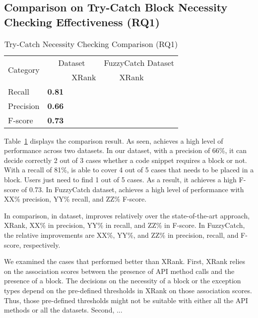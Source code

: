 \subsection{Comparison on Try-Catch Block Necessity Checking Effectiveness (RQ1)}
\label{sec:rq1}

\begin{table}[h]
  \caption{Try-Catch Necessity Checking Comparison (RQ1)}
  \vspace{-12pt}
	\begin{center}
		\renewcommand{\arraystretch}{1}
		\begin{tabular}{p{1.5cm}<{\centering}|p{1.25cm}<{\centering}p{1.25cm}<{\centering}|p{1.25cm}<{\centering}p{1.25cm}<{\centering}}
			\hline
			\multirow{2}{*}{Category} & \multicolumn{2}{c|}{{\tool} Dataset} & \multicolumn{2}{c}{FuzzyCatch Dataset}\\
			\cline{2-5}
			  & \tool  & XRank & \tool  & XRank\\
			\hline
			Recall    & \textbf{0.81} & &&\\
			Precision & \textbf{0.66} & &&\\
			F-score   & \textbf{0.73} & &&\\
			\hline
		\end{tabular}
		\label{tab:xblock}
	\end{center}
\end{table}


Table~\ref{tab:xblock} displays the comparison result. As seen,
{\tool} achieves a high level of performance across two datasets. In
our dataset, with a precision of 66\%, it can decide correctly 2 out
of 3 cases whether a code snippet requires a  block or
not. With a recall of 81\%, {\tool} is able to cover 4 out of 5 cases
that needs to be placed in a  block. Users just need
to find 1 out of 5 cases. As a result, it achieves a high F-score of
0.73. In FuzzyCatch dataset, {\tool} achieves a high level of
performance with XX\% precision, YY\% recall, and ZZ\% F-score.

In comparison, in {\tool} dataset, {\tool} improves relatively over
the state-of-the-art approach, XRank, XX\% in precision, YY\% in
recall, and ZZ\% in F-score. In FuzzyCatch, the relative improvements
are XX\%, YY\%, and ZZ\% in precision, recall, and F-score,
respectively.

We examined the cases that {\tool} performed better than XRank.
First, XRank relies on the association scores between the presence of
API method calls and the presence of a  block. The
decisions on the necessity of a  block or the
exception types depend on the pre-defined thresholds in XRank on those
association scores. Thus, those pre-defined thresholds might not be
suitable with either all the API methods or all the datasets. Second,
...

